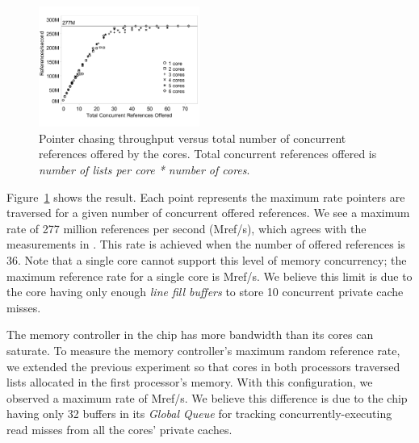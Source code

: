 \documentclass[10pt,nocopyrightspace]{sigplanconf}
\newcommand{\mrps}[1]{\unit[#1]{Mref/s}}
\begin{document}
\begin{figure}[t]
  \vspace{-.1in}
	\begin{center}
		\includegraphics[width=0.47\textwidth]{figures/multi-listwalk-totalconc-edited.pdf}
	\end{center}
	\vspace{-9pt}
	\caption{Pointer chasing throughput versus total number of
          concurrent references offered by the cores. Total concurrent references offered is \emph{number of lists per core * number of cores}.
        }
	\label{fig:listwalk-totalconc}
\end{figure}

Figure~\ref{fig:listwalk-totalconc} shows the result. Each point represents
the maximum rate pointers are traversed for a given number of
concurrent offered references. We see a maximum rate of 277 million references per second (\mrps{}), which agrees with the measurements in \cite{Mandal:2010}. This rate is achieved when the number of offered references is 36. Note that a single core cannot support this level of
memory concurrency; the maximum reference rate for a single core is
\mrps{107}. We believe this limit is due to the core having only enough {\em line fill
  buffers} \cite{nehalem:arch} to store 10 concurrent private cache misses.

The memory controller in the chip has more bandwidth than its
cores can saturate. To measure the memory controller's maximum random
reference rate, we extended the previous experiment so that cores in
both processors traversed lists allocated in the first processor's
memory. With this configuration, we observed a maximum rate of \mrps{360}. We believe this difference is due to the chip having only 32 buffers in its {\em Global Queue} \cite{nehalem:perf} for tracking concurrently-executing read misses from all the cores' private caches.
\end{document}
